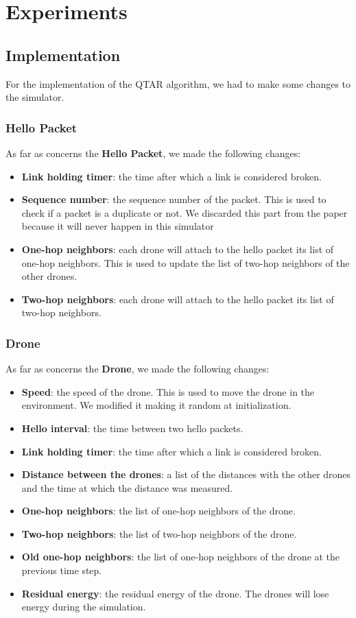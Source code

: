 \section{Experiments}

\subsection{Implementation}
For the implementation of the QTAR algorithm, we had to make some changes to the simulator.

\subsubsection{Hello Packet}
As far as concerns the \textbf{Hello Packet}, we made the following changes:
\begin{itemize}
    \item \textbf{Link holding timer}: the time after which a link is considered broken.
    \item \textbf{Sequence number}: the sequence number of the packet. This is used to check if a packet is a duplicate or not. We discarded this part from the paper because it will never happen in this simulator
    \item \textbf{One-hop neighbors}: each drone will attach to the hello packet its list of one-hop neighbors. This is used to update the list of two-hop neighbors of the other drones.
    \item \textbf{Two-hop neighbors}: each drone will attach to the hello packet its list of two-hop neighbors.
\end{itemize}


\subsubsection{Drone}
As far as concerns the \textbf{Drone}, we made the following changes:
\begin{itemize}
    \item \textbf{Speed}: the speed of the drone. This is used to move the drone in the environment. We modified it making it random at initialization.
    \item \textbf{Hello interval}: the time between two hello packets.
    \item \textbf{Link holding timer}: the time after which a link is considered broken.
    \item \textbf{Distance between the drones}: a list of the distances with the other drones and the time at which the distance was measured.
    \item \textbf{One-hop neighbors}: the list of one-hop neighbors of the drone.
    \item \textbf{Two-hop neighbors}: the list of two-hop neighbors of the drone.
    \item \textbf{Old one-hop neighbors}: the list of one-hop neighbors of the drone at the previous time step.
    \item \textbf{Residual energy}: the residual energy of the drone. The drones will lose energy during the simulation.
\end{itemize}


